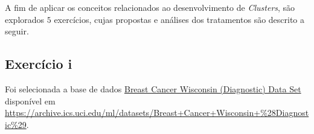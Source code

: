 








A fim de aplicar os conceitos relacionados ao desenvolvimento de \textit{Clusters}, são explorados $5$ exercícios, cujas propostas e análises dos tratamentos são descrito a seguir.



\subsection{Exercício i}

Foi selecionada a base de dados  \href{https://archive.ics.uci.edu/ml/datasets/Breast+Cancer+Wisconsin+\%28Diagnostic\%29}{Breast Cancer Wisconsin (Diagnostic) Data Set} \citep{wolberg_uci_1995}
 disponível em \url{https://archive.ics.uci.edu/ml/datasets/Breast+Cancer+Wisconsin+\%28Diagnostic\%29}.

